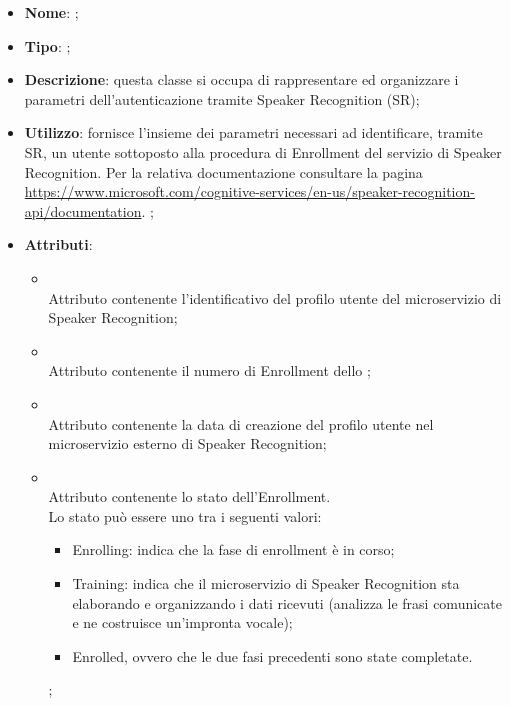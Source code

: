 \begin{itemize}
	\item \textbf{Nome}: ;
	\item \textbf{Tipo}: ;
	\item \textbf{Descrizione}: questa classe si occupa di rappresentare ed organizzare i parametri dell'autenticazione tramite Speaker Recognition (SR);
	\item \textbf{Utilizzo}: fornisce l'insieme dei parametri necessari ad identificare, tramite SR, un utente sottoposto alla procedura di Enrollment del servizio di Speaker Recognition.
Per la relativa documentazione consultare la pagina \url{https://www.microsoft.com/cognitive-services/en-us/speaker-recognition-api/documentation}.
;
	\item \textbf{Attributi}:
	\begin{itemize}
		\item[]  \\
		Attributo contenente l'identificativo del profilo utente del microservizio di Speaker Recognition;
		\item[]  \\
		Attributo contenente il numero di Enrollment dello ;
		\item[]  \\
		Attributo contenente la data di creazione del profilo utente nel microservizio esterno di Speaker Recognition;
		\item[]  \\
		Attributo contenente lo stato dell'Enrollment.\\
Lo stato può essere uno tra i seguenti valori:
\begin{itemize} \item Enrolling: indica che la fase di enrollment è in corso; \item Training: indica che il microservizio di Speaker Recognition sta elaborando e organizzando i dati ricevuti (analizza le frasi comunicate e ne costruisce un'impronta vocale); \item Enrolled, ovvero che le due fasi precedenti sono state completate. \end{itemize};
	\end{itemize}
\end{itemize}
\FloatBarrier

